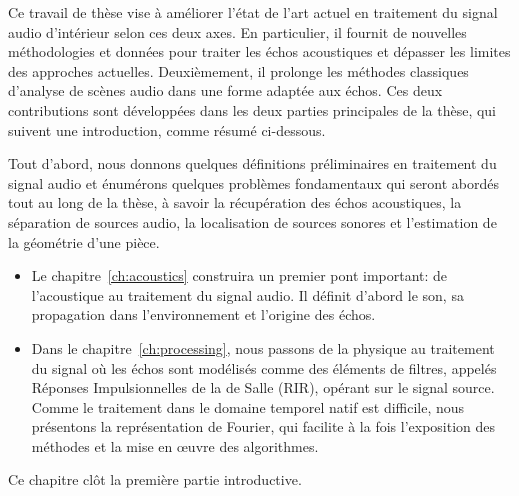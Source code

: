 \mynewline
Ce travail de thèse vise à améliorer l'état de l'art actuel en traitement du signal audio d'intérieur selon ces deux axes.
En particulier, il fournit de nouvelles méthodologies et données pour traiter les échos acoustiques et dépasser les limites des approches actuelles.
Deuxièmement, il prolonge les méthodes classiques d'analyse de scènes audio dans une forme adaptée aux échos.
Ces deux contributions sont développées dans les deux parties principales de la thèse, qui suivent une introduction, comme résumé ci-dessous.

Tout d'abord, nous donnons quelques définitions préliminaires en traitement du signal audio et énumérons quelques problèmes fondamentaux qui seront abordés tout au long de la thèse, à savoir la récupération des échos acoustiques, la séparation de sources audio, la localisation de sources sonores et l'estimation de la géométrie d'une pièce.
\begin{itemize}
    \item
    Le chapitre~\ref{ch:acoustics} construira un premier pont important:
    de l'acoustique au traitement du signal audio.
    Il définit d'abord le son, sa propagation dans l'environnement et l'origine des échos.
    \item
    Dans le chapitre~\ref{ch:processing}, nous passons de la physique au traitement du signal où les échos sont modélisés comme des éléments de filtres, appelés Réponses Impulsionnelles de la de Salle (RIR), opérant sur le signal source.
    Comme le traitement dans le domaine temporel natif est difficile, nous présentons la représentation de Fourier, qui facilite à la fois l'exposition des méthodes et la mise en œuvre des algorithmes.
\end{itemize}
Ce chapitre clôt la première partie introductive.


